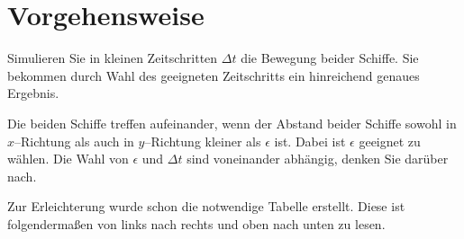 \documentclass[paper=a4,notitlepage,parskip=half,plainheadsepline]{scrartcl}
\begin{document}
\section{Vorgehensweise}
Simulieren Sie in kleinen Zeitschritten $\Delta t$ die Bewegung beider Schiffe.
Sie bekommen durch Wahl des geeigneten Zeitschritts ein hinreichend genaues Ergebnis.


Die beiden Schiffe treffen aufeinander, wenn der Abstand beider Schiffe sowohl in $x$--Richtung als auch in $y$--Richtung kleiner als $\epsilon$ ist. Dabei ist $\epsilon$ geeignet zu wählen. Die Wahl von $\epsilon$ und $\Delta t$ sind voneinander abhängig, denken Sie darüber nach.

Zur Erleichterung wurde schon die notwendige Tabelle erstellt. Diese ist folgendermaßen von links nach rechts und oben nach unten zu lesen.
\end{document}
